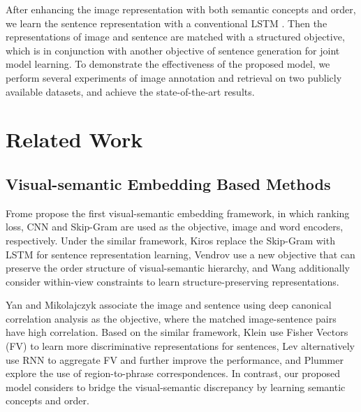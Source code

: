 \documentclass[10pt,twocolumn,letterpaper]{article}
\begin{document}
After enhancing the image representation with both semantic concepts and order,
we learn the sentence representation with a conventional LSTM \cite{hochreiter1997long}.
Then the representations of image and sentence are matched
with a structured objective, which is in conjunction with another objective of
sentence generation for joint model learning.
To demonstrate the effectiveness of the proposed model,
we perform several experiments of image annotation and retrieval
on two publicly available datasets, and achieve the state-of-the-art results.








\section{Related Work}



\subsection{Visual-semantic Embedding Based Methods}

Frome \etal \cite{frome2013devise} propose the first visual-semantic embedding framework,
in which ranking loss, CNN \cite{krizhevsky2012imagenet}
and Skip-Gram \cite{mikolov2013efficient} are used as the objective,
image and word encoders, respectively.
Under the similar framework,
Kiros \etal \cite{kiros2014unifying} replace the Skip-Gram with
LSTM \cite{hochreiter1997long}
for sentence representation learning,
Vendrov \etal \cite{vendrov2015order} use a new objective
that can preserve the order structure of visual-semantic hierarchy,
and Wang \etal \cite{wang2015learning} additionally consider within-view constraints
to learn structure-preserving representations.


Yan and Mikolajczyk \cite{yan2015deep} associate the image and sentence
using deep canonical correlation analysis as the objective,
where the matched image-sentence pairs have high correlation.
Based on the similar framework, Klein \etal \cite{klein2015associating}
use Fisher Vectors (FV) \cite{perronnin2007fisher} to
learn more discriminative representations for sentences,
Lev \etal \cite{lev2015rnn} alternatively use RNN to aggregate FV
and further improve the performance,
and Plummer \etal \cite{plummer2015flickr30k} explore the use of
region-to-phrase correspondences.
In contrast, our proposed model considers to bridge the visual-semantic discrepancy
by learning semantic concepts and order.
\end{document}
